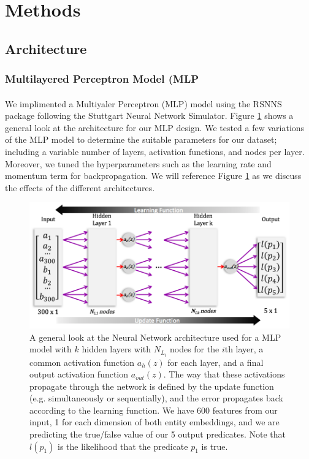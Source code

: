 \documentclass[11.5pt]{article}
\newcounter{Figure}
\newcounter{graphics}
\begin{document}
\section{Methods}
\subsection{Architecture}
\subsubsection{Multilayered Perceptron Model (MLP}
\paragraph{}We implimented a Multiyaler Perceptron (MLP) model using the RSNNS package following the Stuttgart Neural Network Simulator\cite{RSNNS}. Figure \ref{MLPArch} shows a general look at the architecture for our MLP design. We tested a few variations of the MLP model to determine the suitable parameters for our dataset; including a variable number of layers, activation functions, and nodes per layer. Moreover, we tuned the hyperparameters such as the learning rate and momentum term for backpropagation. We will reference Figure \ref{MLPArch} as we discuss the effects of the different architectures. 


\begin{figure}[h!]
 \includegraphics[width=1\textwidth]{report_mlp/GenArchitecture.png}
  \caption{\small A general look at the Neural Network architecture used for a MLP model with $k$ hidden layers with $N_{L_i}$ nodes for the $i$th layer, a common activation function $a_h(z)$ for each layer, and a final output activation function $a_{out}(z)$. The way that these activations propagate through the network is defined by the update function (e.g. simultaneously or sequentially), and the error propagates back according to the learning function. We have 600 features from our input, 1 for each dimension of both entity embeddings, and we are predicting the true/false value of our 5 output predicates. Note that $l(p_1)$ is the likelihood that the predicate $p_1$ is true.  }
  \label{MLPArch}
\end{figure}
\end{document}
